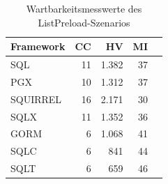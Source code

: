 \begin{table}[ht]
\centering
\caption{Wartbarkeitsmesswerte des ListPreload-Szenarios}
\begin{tabular}{lrrrr}
\toprule
Framework & CC & HV & MI \\
\midrule
	SQL & 11 & 1.382 & 37 \\
	PGX & 10 & 1.312 & 37 \\
	SQUIRREL & 16 & 2.171 & 30 \\
	SQLX & 11 & 1.352 & 36 \\
	GORM & 6 & 1.068 & 41 \\
	SQLC & 6 & 841 & 44 \\
	SQLT & 6 & 659 & 46 \\
\bottomrule
\end{tabular}
\label{tab:wartbarkeit_listpreload}
\end{table}
	